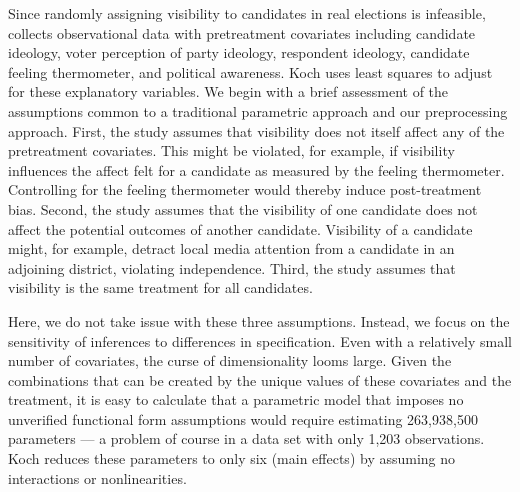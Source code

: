 \documentclass[11pt,titlepage]{article}
\begin{document}
Since randomly assigning visibility to candidates in real elections is
infeasible, \citet{Koch02} collects observational data with
pretreatment covariates including candidate ideology, voter perception
of party ideology, respondent ideology, candidate feeling thermometer,
and political awareness.  Koch uses least squares to adjust for these
explanatory variables.  We begin with a brief assessment of the
assumptions common to a traditional parametric approach and our
preprocessing approach.  First, the study assumes that visibility does
not itself affect any of the pretreatment covariates.  This might be
violated, for example, if visibility influences the affect felt for a
candidate as measured by the feeling thermometer.  Controlling for the
feeling thermometer would thereby induce post-treatment bias.  Second,
the study assumes that the visibility of one candidate does not affect
the potential outcomes of another candidate.  Visibility of a
candidate might, for example, detract local media attention from a
candidate in an adjoining district, violating independence.  Third,
the study assumes that visibility is the same treatment for all
candidates.

Here, we do not take issue with these three assumptions.  Instead, we
focus on the sensitivity of inferences to differences in
specification.  Even with a relatively small number of covariates, the
curse of dimensionality looms large.  Given the combinations that can
be created by the unique values of these covariates and the treatment,
it is easy to calculate that a parametric model that imposes no
unverified functional form assumptions would require estimating
263,938,500 parameters --- a problem of course in a data set with only
1,203 observations.  Koch reduces these parameters to only six (main
effects) by assuming no interactions or nonlinearities.
\end{document}
